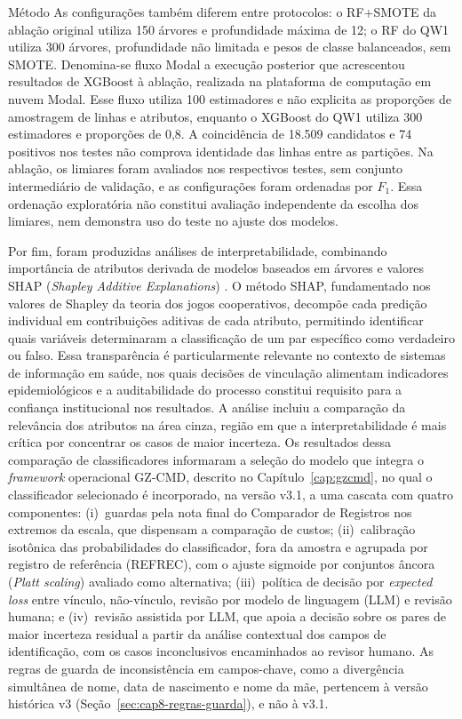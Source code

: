 \begin{chapter}{Método}
As configurações também diferem entre protocolos: o RF+SMOTE da ablação original utiliza 150 árvores e profundidade máxima de 12; o RF do QW1 utiliza 300 árvores, profundidade não limitada e pesos de classe balanceados, sem SMOTE. Denomina-se fluxo Modal a execução posterior que acrescentou resultados de XGBoost à ablação, realizada na plataforma de computação em nuvem Modal. Esse fluxo utiliza 100 estimadores e não explicita as proporções de amostragem de linhas e atributos, enquanto o XGBoost do QW1 utiliza 300 estimadores e proporções de 0,8. A coincidência de 18.509 candidatos e 74 positivos nos testes não comprova identidade das linhas entre as partições. Na ablação, os limiares foram avaliados nos respectivos testes, sem conjunto intermediário de validação, e as configurações foram ordenadas por $F_1$. Essa ordenação exploratória não constitui avaliação independente da escolha dos limiares, nem demonstra uso do teste no ajuste dos modelos.

Por fim, foram produzidas análises de interpretabilidade, combinando importância de atributos derivada de modelos baseados em árvores e valores SHAP (\textit{Shapley Additive Explanations}) \cite{Lundberg2017shap}. O método SHAP, fundamentado nos valores de Shapley da teoria dos jogos cooperativos, decompõe cada predição individual em contribuições aditivas de cada atributo, permitindo identificar quais variáveis determinaram a classificação de um par específico como verdadeiro ou falso. Essa transparência é particularmente relevante no contexto de sistemas de informação em saúde, nos quais decisões de vinculação alimentam indicadores epidemiológicos e a auditabilidade do processo constitui requisito para a confiança institucional nos resultados. A análise incluiu a comparação da relevância dos atributos na área cinza, região em que a interpretabilidade é mais crítica por concentrar os casos de maior incerteza. Os resultados dessa comparação de classificadores informaram a seleção do modelo que integra o \textit{framework} operacional GZ-CMD, descrito no Capítulo~\ref{cap:gzcmd}, no qual o classificador selecionado é incorporado, na versão v3.1, a uma cascata com quatro componentes: (i)~guardas pela nota final do Comparador de Registros nos extremos da escala, que dispensam a comparação de custos; (ii)~calibração isotônica das probabilidades do classificador, fora da amostra e agrupada por registro de referência (REFREC), com o ajuste sigmoide por conjuntos âncora (\textit{Platt scaling}) avaliado como alternativa; (iii)~política de decisão por \textit{expected loss} entre vínculo, não-vínculo, revisão por modelo de linguagem (LLM) e revisão humana; e (iv)~revisão assistida por LLM, que apoia a decisão sobre os pares de maior incerteza residual a partir da análise contextual dos campos de identificação, com os casos inconclusivos encaminhados ao revisor humano. As regras de guarda de inconsistência em campos-chave, como a divergência simultânea de nome, data de nascimento e nome da mãe, pertencem à versão histórica v3 (Seção~\ref{sec:cap8-regras-guarda}), e não à v3.1.


\end{chapter}
